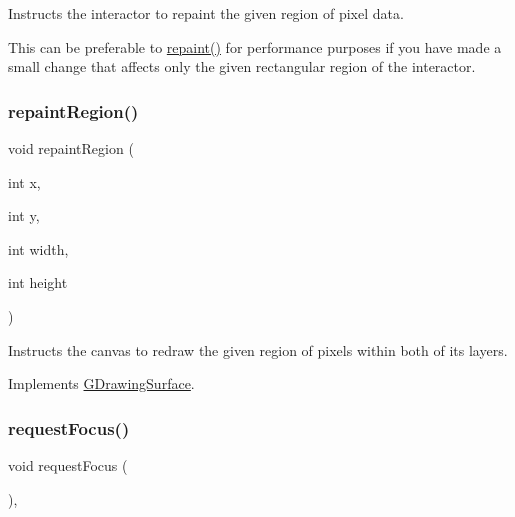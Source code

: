 Instructs the interactor to repaint the given region of pixel data. 

This can be preferable to \mbox{\hyperlink{classGCanvas_ab93427f61c64e3db7f2637519aed1c00}{repaint()}} for performance purposes if you have made a small change that affects only the given rectangular region of the interactor. \mbox{\label{classGCanvas_a52152a764c4c4b092f826eee5d6554aa}} 
\subsubsection{\texorpdfstring{repaint\+Region()}{repaintRegion()}\hspace{0.1cm}{\footnotesize\ttfamily [2/2]}}
{\footnotesize\ttfamily void repaint\+Region (\begin{DoxyParamCaption}\item[{int}]{x,  }\item[{int}]{y,  }\item[{int}]{width,  }\item[{int}]{height }\end{DoxyParamCaption})\hspace{0.3cm}{\ttfamily [virtual]}}



Instructs the canvas to redraw the given region of pixels within both of its layers. 



Implements \mbox{\hyperlink{classGDrawingSurface_a1a3898317080fecf8af21bbeaeeb37c3}{G\+Drawing\+Surface}}.

\mbox{\label{classGInteractor_a519fb2ac767f8b2febbb50b898b8c8cb}} 
\subsubsection{\texorpdfstring{request\+Focus()}{requestFocus()}}
{\footnotesize\ttfamily void request\+Focus (\begin{DoxyParamCaption}{ }\end{DoxyParamCaption})\hspace{0.3cm}{\ttfamily [virtual]}, {\ttfamily [inherited]}}



